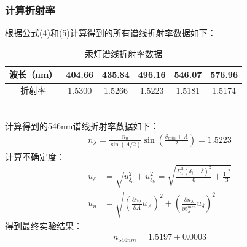 \documentclass[UTF8]{ctexart}
\begin{document}
\subsubsection{计算折射率}
根据公式(4)和(5)计算得到的所有谱线折射率数据如下：\\
\begin{table}[h]
    \begin{center}
        \begin{tabular}{|c|c|c|c|c|c|}
            \hline
            波长（nm）& 404.66 & 435.84 & 496.16 & 546.07 & 576.96 \\
            \hline
            折射率 & 1.5300 & 1.5266 & 1.5223 & 1.5181 & 1.5174 \\
            \hline
        \end{tabular}
        \caption{汞灯谱线折射率数据}
    \end{center}
\end{table}
\\
计算得到的546nm谱线折射率数据如下：\\
\begin{align}
    n_\lambda=\frac{n_0}{\sin(A/2)}\sin(\frac{\delta_{min}+A}{2})=1.5223
\end{align}
计算不确定度：
\begin{align}
    u_\delta&=\sqrt{u_{\delta_a}^2+u_{\delta_b}^2}=\sqrt{\frac{\Sigma_1^3(\delta_i-\bar{\delta})^2}{6}+\frac{1'^2}{3}} \\
    u_{n}&=\sqrt{(\frac{\partial n_{\lambda}}{\partial A} u_A)^2+(\frac{\partial n_{\lambda}}{\partial \delta_{\lambda}^{min}}u_{\delta})^2}
\end{align}
得到最终实验结果：
\begin{align}
    n_{546nm}=1.5197\pm 0.0003
\end{align}
\\
\end{document}
